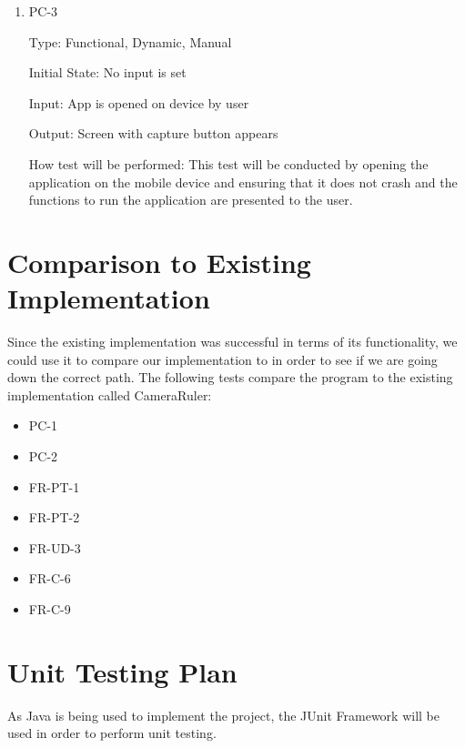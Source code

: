 \documentclass[12pt, titlepage]{article}
\begin{document}
\begin{enumerate}

\item{PC-3\\}

Type: Functional, Dynamic, Manual
					
Initial State: No input is set
					
Input: App is opened on device by user
					
Output: Screen with capture button appears 
					
How test will be performed: This test will be conducted by opening the application on the mobile device and ensuring that it does not crash and the functions to run the application are presented to the user.  

\end{enumerate}

	
\section{Comparison to Existing Implementation}	

Since the existing implementation was successful in terms of its functionality, we could use it to compare our implementation to in order to see if we are going down the correct path. The following tests compare the program to the existing implementation called CameraRuler:

\begin{itemize}
\item{PC-1\\}
\item{PC-2\\}
\item{FR-PT-1\\}
\item{FR-PT-2\\}
\item{FR-UD-3\\}
\item{FR-C-6\\}
\item{FR-C-9\\}

\end{itemize}
				
\section{Unit Testing Plan}

As Java is being used to implement the project, the {\color{red}JUnit} Framework will be used in order to perform unit testing.
		
\end{document}
